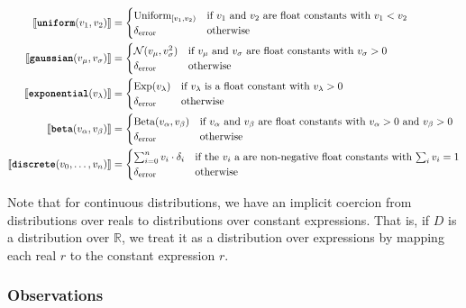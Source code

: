 \begin{align*}
\sem{ \uniform(v_1, v_2) } &= \begin{cases}
\text{Uniform}_{[v_1, v_2)}  & \text{if $v_1$ and $v_2$ are float constants with $v_1 < v_2$} \\
%
\delta_\error & \text{otherwise}
\end{cases}
\\
\sem{ \gaussian(v_\mu, v_\sigma) } &= 
 \begin{cases}
	\mathcal{N}(v_\mu, v_\sigma^2)  & \text{if $v_\mu$ and $v_\sigma$ are float constants with $v_\sigma > 0$} \\
	\delta_\error & \text{otherwise}
\end{cases}
\\
\sem{ \exponential(v_\lambda) } &= 
 \begin{cases}
	\text{Exp}(v_\lambda)   & \text{if $v_\lambda$ is a float constant with $v_\lambda > 0$} \\
	\delta_\error & \text{otherwise}
\end{cases}
\\
\sem{ \betafn(v_\alpha, v_\beta) } &= 
 \begin{cases}
	\text{Beta}(v_\alpha, v_\beta)   & \text{if $v_\alpha$ and $v_\beta$ are float constants with $v_\alpha > 0$ and $v_\beta > 0$} \\
	\delta_\error & \text{otherwise}
\end{cases}
\\
\sem{ \discrete(v_0, \ldots, v_n) } &= %
\begin{cases}
	\sum_{i=0}^n v_i \cdot \delta_i & \text{if the $v_i$ a are non-negative float constants with $\sum_i v_i = 1$} \\
	\delta_\error  & \text{otherwise}
\end{cases}
\end{align*}

Note that for continuous distributions, we have an implicit coercion from distributions over reals to distributions over constant expressions. That is, if $D$ is a distribution over $\mathbb{R}$, we treat it as a distribution over expressions by mapping each real $r$ to the constant expression $r$.

\subsubsection{Observations}

